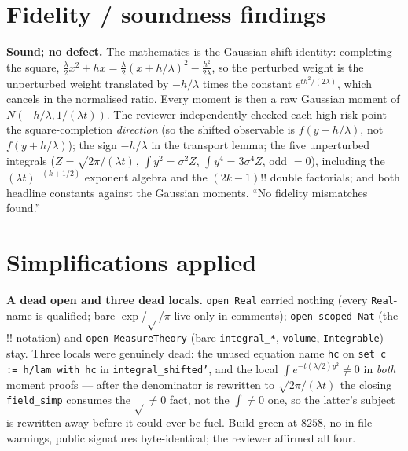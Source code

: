 \documentclass[11pt]{article}
\begin{document}
\section{Fidelity / soundness findings}
\textbf{Sound; no defect.} The mathematics is the Gaussian-shift identity: completing the square,
$\tfrac{\lambda}{2}x^2+hx=\tfrac{\lambda}{2}(x+h/\lambda)^2-\tfrac{h^2}{2\lambda}$, so the perturbed
weight is the unperturbed weight translated by $-h/\lambda$ times the constant
$e^{th^2/(2\lambda)}$, which cancels in the normalised ratio. Every moment is then a raw Gaussian
moment of $N(-h/\lambda,1/(\lambda t))$. The reviewer independently checked each high-risk point ---
the square-completion \emph{direction} (so the shifted observable is $f(y-h/\lambda)$, not
$f(y+h/\lambda)$); the sign $-h/\lambda$ in the transport lemma; the five unperturbed integrals
($Z=\sqrt{2\pi/(\lambda t)}$, $\int y^2=\sigma^2 Z$, $\int y^4=3\sigma^4 Z$, odd $=0$), including the
$(\lambda t)^{-(k+1/2)}$ exponent algebra and the $(2k-1)!!$ double factorials; and both headline
constants against the Gaussian moments. ``No fidelity mismatches found.''

\section{Simplifications applied}
\textbf{A dead open and three dead locals.} \texttt{open Real} carried nothing (every
\texttt{Real}-name is qualified; bare $\exp$/$\sqrt{}$/$\pi$ live only in comments); \texttt{open
scoped Nat} (the $!!$ notation) and \texttt{open MeasureTheory} (bare \texttt{integral\_*},
\texttt{volume}, \texttt{Integrable}) stay. Three locals were genuinely dead: the unused equation
name \texttt{hc} on \texttt{set c := h/lam with hc} in \texttt{integral\_shifted'}, and the local
$\int e^{-t(\lambda/2)y^2}\ne 0$ in \emph{both} moment proofs --- after the denominator is rewritten
to $\sqrt{2\pi/(\lambda t)}$ the closing \texttt{field\_simp} consumes the $\sqrt{}\ne 0$ fact, not
the $\int\ne 0$ one, so the latter's subject is rewritten away before it could ever be fuel. Build
green at $8258$, no in-file warnings, public signatures byte-identical; the reviewer affirmed all
four.
\end{document}
